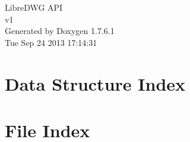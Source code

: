 \documentclass[a4paper]{book}
\begin{document}
\hypersetup{pageanchor=false,citecolor=blue}
\begin{titlepage}
\vspace*{7cm}
\begin{center}
{\Large \-Libre\-D\-W\-G \-A\-P\-I \\[1ex]\large v1 }\\
\vspace*{1cm}
{\large \-Generated by Doxygen 1.7.6.1}\\
\vspace*{0.5cm}
{\small Tue Sep 24 2013 17:14:31}\\
\end{center}
\end{titlepage}
\clearemptydoublepage
{}
\tableofcontents
\clearemptydoublepage
{}
\hypersetup{pageanchor=true,citecolor=blue}
\chapter{\-Data \-Structure \-Index}

\chapter{\-File \-Index}

\end{document}
